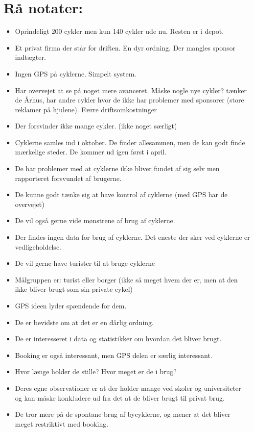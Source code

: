 \section{Rå notater:}

\begin{itemize}
\item Oprindeligt 200 cykler men kun 140 cykler ude nu. Resten er i depot.
\item Et privat firma der står for driften. En dyr ordning. Der mangles sponsor indtægter.
\item Ingen GPS på cyklerne. Simpelt system.
\item Har overvejet at se på noget mere avanceret. Måske nogle nye cykler? tænker de
Århus, har andre cykler hvor de ikke har problemer med sponsorer (store reklamer på hjulene). Færre driftsomkostninger
\item Der forsvinder ikke mange cykler. (ikke noget særligt)
\item Cyklerne samles ind i oktober. De finder allesammen, men de kan godt finde mærkelige steder. De kommer ud igen først i april.
\item De har problemer med at cyklerne ikke bliver fundet af sig selv men rapporteret forsvundet af brugerne.
\item De kunne godt tænke sig at have kontrol af cyklerne (med GPS har de overvejet)
\item De vil også gerne vide mønstrene af brug af cyklerne.
\item Der findes ingen data for brug af cyklerne. Det eneste der sker ved cyklerne er vedligeholdelse.
\item De vil gerne have turister til at bruge cyklerne
\item Målgruppen er: turist eller borger (ikke så meget hvem der er, men at den ikke bliver brugt som sin private cykel)
\item GPS ideen lyder spændende for dem.
\item De er bevidste om at det er en dårlig ordning.
\item De er interesseret i data og statistikker om hvordan det bliver brugt.
\item Booking er også interessant, men GPS delen er særlig interessant.
\item Hvor længe holder de stille? Hvor meget er de i brug?
\item Deres egne observationer er at der holder mange ved skoler og universiteter og kan måske konkludere ud fra det at de bliver brugt til privat brug.
\item De tror mere på de spontane brug af bycyklerne, og mener at det bliver meget restriktivt med booking.
\end{itemize}